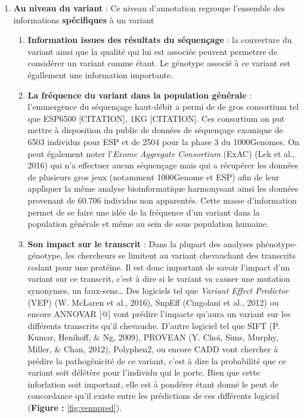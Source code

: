 \documentclass[12pt,twoside]{reedthesis}
\providecommand{\tightlist}{%
  \setlength{\itemsep}{0pt}\setlength{\parskip}{0pt}}
\theoremstyle{definition}
\theoremstyle{definition}
\theoremstyle{remark}
\begin{document}
  \begin{enumerate}
  \def\labelenumi{\arabic{enumi}.}
  \tightlist
  \item
    \textbf{Au niveau du variant} : Ce niveau d'annotation regroupe
    l'ensemble des informations \textbf{spécifiques} à un variant
  
    \begin{enumerate}
    \def\labelenumii{\alph{enumii}.}
    \tightlist
    \item
      \textbf{Information issues des résultats du séquençage} : la
      couverture du variant ainsi que la qualité qui lui est associée
      peuvent permetrre de considérer un variant comme étant. Le génotype
      associé à ce variant est égallement une information importante.\\
    \item
      \textbf{La fréquence du variant dans la population générale} :
      l'emmergence du séquençage haut-débit a permi de de gros consortium
      tel que ESP6500 {[}CITATION{]}, 1KG {[}CITATION{]}. Ces consortium
      on put mettre à disposition du public de données de séquençage
      exomique de 6503 individus pour ESP et de 2504 pour la phase 3 du
      1000Genomes. On peut également noter l'\emph{Exome Aggregate
      Consortium} (ExAC) (Lek et al., 2016) qui n'a effectuer aucun
      séquençage mais qui a récupérer les données de plusieurs gros jeux
      (notamment 1000Genome et ESP) afin de leur appliquer la même analyse
      bioinformatique harmonysant ainsi les données provenant de 60.706
      individus non apparentés. Cette masse d'information permet de se
      faire une idée de la fréquence d'un variant dans la population
      générale et même au sein de sous population humaine.\\
    \item
      \textbf{Son impact sur le transcrit} : Dans la plupart des analyses
      phénotype-génotype, les chercheurs se limitent au variant
      chevauchant des transcrits codant pour une protéine. Il est donc
      important de savoir l'impact d'un variant sur ce transcrit, c'est à
      dire si le variant va causer une mutation synonymes, un
      faux-sens\ldots{} Des logiciels tel que \emph{Variant Effect
      Predictor} (VEP) (W. McLaren et al., 2016), SnpEff (Cingolani et
      al., 2012) ou encore ANNOVAR {[}@{]} vont prédire l'impacte qu'aura
      un variant sur les différents transcrits qu'il chevauche. D'autre
      logiciel tel que SIFT (P. Kumar, Henikoff, \& Ng, 2009), PROVEAN (Y.
      Choi, Sims, Murphy, Miller, \& Chan, 2012), Polyphen2, ou encore
      CADD vont chercher à prédire la pathogénicité de ce variant, c'est à
      dire la probabilité que ce variant soit délétère pour l'individu qui
      le porte. Bien que cette inforlation soit important, elle est à
      pondérer étant donné le peut de concordance qu'il existe entre les
      prédictions de ces différents logiciel (\textbf{Figure :}
      \ref{fig:vennpred}).
    \end{enumerate}
  \end{enumerate}
  
\end{document}
